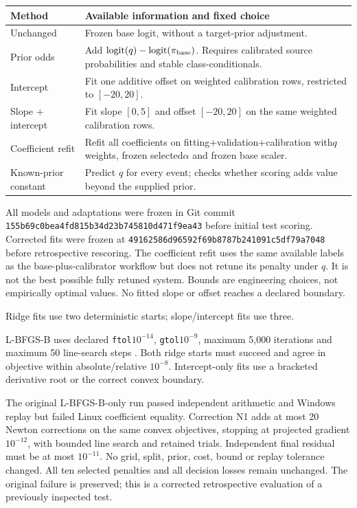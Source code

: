 \documentclass[10pt]{article}
\newcommand{\smallhead}[1]{\vspace{6pt}{\large\bfseries #1}\par}
\begin{document}
\begin{center}\small
\begin{tabular}{p{.23\linewidth}p{.66\linewidth}}
\toprule
Method & Available information and fixed choice\\\midrule
Unchanged & Frozen base logit, without a target-prior adjustment.\\
Prior odds & Add $\operatorname{logit}(q)-\operatorname{logit}(\pi_{\rm base})$. Requires calibrated source probabilities and stable class-conditionals.\\
Intercept & Fit one additive offset on weighted calibration rows, restricted to $[-20,20]$.\\
Slope + intercept & Fit slope $[0,5]$ and offset $[-20,20]$ on the same weighted calibration rows.\\
Coefficient refit & Refit all coefficients on fitting+validation+calibration with$q$ weights, frozen selected$\alpha$ and frozen base scaler.\\
Known-prior constant & Predict $q$ for every event; checks whether scoring adds value beyond the supplied prior.\\
\bottomrule
\end{tabular}
\end{center}

All models and adaptations were frozen in Git commit
\texttt{155b69c0bea4fd815b34d23b745810d471f9ea43} before initial test scoring. Corrected fits were frozen at \texttt{49162586d96592f69b8787b241091c5df79a7048} before retrospective rescoring. The coefficient refit uses the same available labels as the base-plus-calibrator workflow but does not retune its penalty under $q$. It is not the best possible fully retuned system. Bounds are engineering choices, not empirically optimal values. No fitted slope or offset reaches a declared boundary.

\smallhead{Optimization evidence}
Ridge fits use two deterministic starts; slope/intercept fits use three.

L-BFGS-B uses declared \texttt{ftol}$10^{-14}$, \texttt{gtol}$10^{-9}$, maximum 5,000 iterations and maximum 50 line-search steps \cite{scipy}. Both ridge starts must succeed and agree in objective within absolute/relative $10^{-8}$. Intercept-only fits use a bracketed derivative root or the correct convex boundary.

The original L-BFGS-B-only run passed independent arithmetic and Windows replay but failed Linux coefficient equality. Correction N1 adds at most 20 Newton corrections on the same convex objectives, stopping at projected gradient $10^{-12}$, with bounded line search and retained trials. Independent final residual must be at most $10^{-11}$. No grid, split, prior, cost, bound or replay tolerance changed. All ten selected penalties and all decision losses remain unchanged. The original failure is preserved; this is a corrected retrospective evaluation of a previously inspected test.
\newpage
\end{document}
